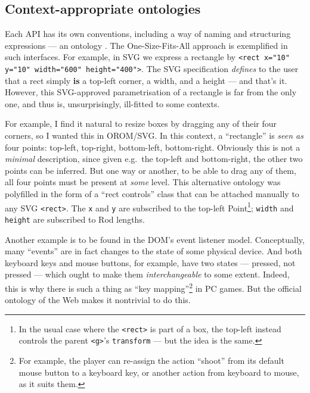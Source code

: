 \hypertarget{context-appropriate-ontologies}{%
\subsection{Context-appropriate
ontologies}\label{context-appropriate-ontologies}}

Each API has its own conventions, including a way of naming and
structuring expressions --- an ontology \cite{crit-semprola}. The
One-Size-Fits-All approach is exemplified in such interfaces. For
example, in SVG we express a rectangle by
\texttt{\textless{}rect x="10" y="10" width="600" height="400"\textgreater{}}.
The SVG specification \emph{defines} to the user that a rect simply
\textbf{is} a top-left corner, a width, and a height --- and that's it.
However, this SVG-approved parametrisation of a rectangle is far from
the only one, and thus is, unsurprisingly, ill-fitted to some contexts.

For example, I find it natural to resize boxes by dragging any of their
four corners, so I wanted this in OROM/SVG. In this context, a
``rectangle'' is \emph{seen as} four points: top-left, top-right,
bottom-left, bottom-right. Obviously this is not a \emph{minimal}
description, since given e.g.~the top-left and bottom-right, the other
two points can be inferred. But one way or another, to be able to drag
any of them, all four points must be present at \emph{some} level. This
alternative ontology was polyfilled in the form of a ``rect controls''
class that can be attached manually to any SVG
\texttt{\textless{}rect\textgreater{}}. The \texttt{x} and \texttt{y}
are subscribed to the top-left Point\footnote{In the usual case where
  the \texttt{\textless{}rect\textgreater{}} is part of a box, the
  top-left instead controls the parent
  \texttt{\textless{}g\textgreater{}}'s \texttt{transform} --- but the
  idea is the same.}; \texttt{width} and \texttt{height} are subscribed
to Rod lengths.

Another example is to be found in the DOM's event listener model.
Conceptually, many ``events'' are in fact changes to the state of some
physical device. And both keyboard keys and mouse buttons, for example,
have two states --- pressed, not pressed --- which ought to make them
\emph{interchangeable} to some extent. Indeed, this is why there is such
a thing as ``key mapping''\footnote{For example, the player can
  re-assign the action ``shoot'' from its default mouse button to a
  keyboard key, or another action from keyboard to mouse, as it suits
  them.} in PC games. But the official ontology of the Web makes it
nontrivial to do this.

